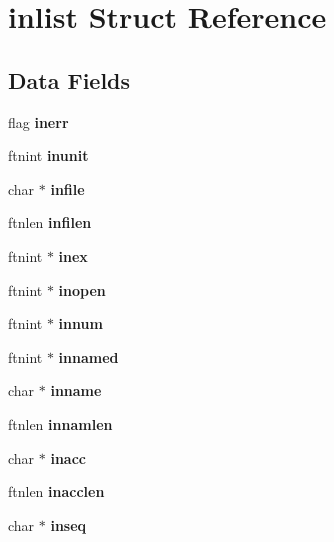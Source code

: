 \section{inlist Struct Reference}
\label{structinlist}
\subsection*{Data Fields}
\begin{DoxyCompactItemize}
\item 
flag {\bfseries inerr}\label{structinlist_a58bf72b64fab5d27aa0f7ef878d5c8d2}

\item 
ftnint {\bfseries inunit}\label{structinlist_a69244da0365f1012d4ed89d569c7e687}

\item 
char $\ast$ {\bfseries infile}\label{structinlist_a335023ababe7eb52a89577de0a1f155c}

\item 
ftnlen {\bfseries infilen}\label{structinlist_a09d868ed15261e31dfe2d6471d3f73e1}

\item 
ftnint $\ast$ {\bfseries inex}\label{structinlist_a6266bd70b0f26d29d084e9e159cf7907}

\item 
ftnint $\ast$ {\bfseries inopen}\label{structinlist_a791dfdf3cc38883912c17f44dfbbb2af}

\item 
ftnint $\ast$ {\bfseries innum}\label{structinlist_a0827d903d61f0f02e48414de0893e7a9}

\item 
ftnint $\ast$ {\bfseries innamed}\label{structinlist_a020090cdbc0134b62d96dee447ded084}

\item 
char $\ast$ {\bfseries inname}\label{structinlist_ac34ac359c5711418bc7a0fe50bc017e5}

\item 
ftnlen {\bfseries innamlen}\label{structinlist_ae975e40f5e868451a31221c7cfe4da4e}

\item 
char $\ast$ {\bfseries inacc}\label{structinlist_aa4fb66e031aa3c7c4d8659145091ff6b}

\item 
ftnlen {\bfseries inacclen}\label{structinlist_a78dde025010d1d60468984985467e5a5}

\item 
char $\ast$ {\bfseries inseq}\label{structinlist_a31bfcb7364ef9a1fd38262997247ca67}


\end{DoxyCompactItemize}
